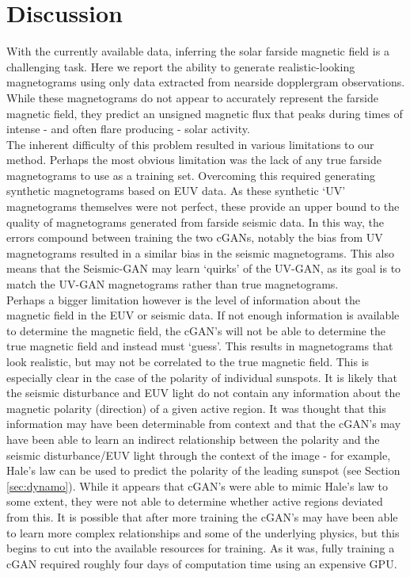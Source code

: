 \documentclass[11pt,a4paper,onecolumn]{report}
\begin{document}
%
%
%
%
%
\chapter{Discussion}
\label{chap:discussion}
%
%
%
%
%


With the currently available data, inferring the solar farside magnetic field is
a challenging task. Here we report the ability to generate realistic-looking
magnetograms using only data extracted from nearside dopplergram observations.
While these magnetograms do not appear to accurately represent the farside
magnetic field, they predict an unsigned magnetic flux that peaks during times
of intense - and often flare producing - solar activity.\\

The inherent difficulty of this problem resulted in various limitations to our
method. Perhaps the most obvious limitation was the lack of any true farside
magnetograms to use as a training set. Overcoming this required generating
synthetic magnetograms based on EUV data. As these synthetic `UV' magnetograms
themselves were not perfect, these provide an upper bound to the quality of
magnetograms generated from farside seismic data. In this way, the errors
compound between training the two cGANs, notably the bias from UV magnetograms
resulted in a similar bias in the seismic magnetograms. This also means that the
Seismic-GAN may learn `quirks' of the UV-GAN, as its goal is to match the UV-GAN
magnetograms rather than true magnetograms. \\ %

Perhaps a bigger limitation however is the level of information about the
magnetic field in the EUV or seismic data. If not enough information is
available to determine the magnetic field, the cGAN's will not be able to
determine the true magnetic field and instead must `guess'. This results in
magnetograms that look realistic, but may not be correlated to the true magnetic
field. This is especially clear in the case of the polarity of individual
sunspots. It is likely that the seismic disturbance and EUV light do not contain
any information about the magnetic polarity (direction) of a given active
region. It was thought that this information may have been determinable from
context and that the cGAN's may have been able to learn an indirect relationship
between the polarity and the seismic disturbance/EUV light through the context
of the image - for example, Hale's law can be used to predict the polarity of the
leading sunspot (see Section \ref{sec:dynamo}). While it appears that cGAN's
were able to mimic Hale's law to some extent, they were not able to determine
whether active regions deviated from this. It is possible that after more
training the cGAN's may have been able to learn more complex relationships and
some of the underlying physics, but this begins to cut into the available
resources for training. As it was, fully training a cGAN required roughly four
days of computation time using an expensive GPU. \\
\end{document}
